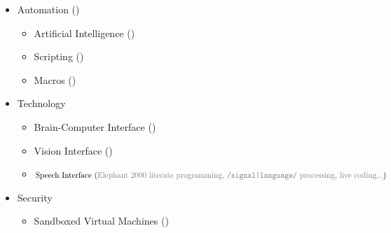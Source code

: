 \documentclass[12pt,a4paper,oneside]{article}
\newcommand{\sh}[1]{{\color{gray}{#1}}}
\begin{document}
\begin{itemize}
	\item Automation (\sh{Lisp, Prolog,..})
		\begin{itemize}
			\item Artificial Intelligence (\sh{Lisp, Prolog,..})
			\item Scripting (\sh{Lisp, Prolog,..})
			\item Macros (\sh{Lisp, Emacs, StumpWM, Prolog,..}) %
		\end{itemize}
	\item Technology
		\begin{itemize}
			\item Brain-Computer Interface (\sh{OpenBCI + yoga = technological singularity})%
			\item Vision Interface (\sh{GPGPU})
			\item $\text{Speech Interface (\sh{Elephant 2000 literate programming, \texttt{/signal|language/} processing, live coding,..})}$ %
		\end{itemize}
	\item Security
		\begin{itemize}
			\item Sandboxed Virtual Machines (\sh{honeypots, virtual routers, virtual DNS servers,..})

\end{itemize}
\end{itemize}
\end{document}

